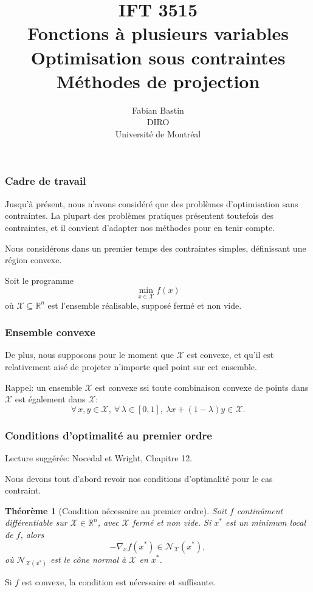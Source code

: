 \documentclass[t,usepdftitle=false]{beamer}
\title[IFT3515]{IFT 3515\\Fonctions à plusieurs variables\\Optimisation sous contraintes\\Méthodes de projection}
\author[Fabian Bastin]{Fabian Bastin\\DIRO\\Université de Montréal}
\date{}
\newtheorem{thm}{Théorème}
\def\cX{\mathcal{X}}
\begin{document}
\frame{\titlepage}

\begin{frame}
\frametitle{Cadre de travail}

Jusqu'à présent, nous n'avons considéré que des problèmes d'optimisation sans contraintes.
La plupart des problèmes pratiques présentent toutefois des contraintes, et il convient d'adapter nos méthodes pour en tenir compte.

\mbox{}

Nous considérons dans un premier temps des contraintes simples, définissant une région convexe.

\mbox{}

Soit le programme
$$
\min_{x \in \cX} f(x)
$$
où $\cX \subseteq \mathbb{R}^n$ est l'ensemble réalisable, supposé fermé et non vide.

\end{frame}

\begin{frame}
\frametitle{Ensemble convexe}

De plus, nous supposons pour le moment que $\cX$ est convexe, et qu'il est relativement aisé de projeter n'importe quel point sur cet ensemble.

\mbox{}

Rappel: un ensemble $\cX$ est convexe ssi toute combinaison convexe de points dans $\cX$ est également dans $\cX$:
$$
\forall\, x, y \in \cX,\ \forall\, \lambda \in [0,1],\ \lambda x + (1-\lambda)y \in \cX.
$$
\end{frame}
	
\begin{frame}
\frametitle{Conditions d'optimalité au premier ordre}

Lecture suggérée: Nocedal et Wright, Chapitre 12.

\mbox{}

Nous devons tout d'abord revoir nos conditions d'optimalité pour le cas contraint.

\mbox{}

\begin{thm}[Condition nécessaire au premier ordre]
Soit $f$ continûment différentiable sur $\cX \in \mathbb{R}^n$, avec $\cX$ fermé et non vide.
Si $x^*$ est un minimum local de $f$, alors
\[
-\nabla_x f(x^*) \in \mathcal{N}_{\mathcal{X}}(x^*),
\]
où $\mathcal{N}_{\cX(x^*)}$ est le cône normal à $\mathcal{X}$ en $x^*$.
\end{thm}	

\mbox{}

Si $f$ est convexe, la condition est nécessaire et suffisante.

\end{frame}
\end{document}
